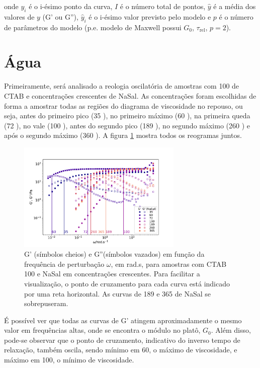 		\noindent onde \(y_i\) é o i-ésimo ponto da curva, \(I\) é o número total de pontos, \(\hat{y}\) é a média dos valores de \(y\) (G' ou G''), \(\hat{y}_i\) é o i-ésimo valor previsto pelo modelo e \(p\) é o número de parâmetros do modelo (p.e. modelo de Maxwell possui \(G_0\), \(\tau_\mathrm{rel}\), \(p=2\)).
		
		\section{Água}
		
		Primeiramente, será analisado a reologia oscilatória de amostras com 100 \mM{} de CTAB e concentrações crescentes de NaSal. As concentrações foram escolhidas de forma a amostrar todas as regiões do diagrama de viscosidade no repouso, ou seja, antes do primeiro pico (35 \mM), no primeiro máximo (60 \mM), na primeira queda (72 \mM), no vale (100 \mM), antes do segundo pico (189 \mM), no segundo máximo (260 \mM) e após o segundo máximo (360 \mM). A figura \ref{fig:oscilatorio_agua} mostra todos os reogramas juntos.
		
		\begin{figure}[h]
			\centering
			\includegraphics[width=0.7\textwidth]{imagens/reologia/oscilatorio_agua}
			\caption[Reogramas para água]{G' (símbolos cheios) e G''(símbolos vazados) em função da frequência de perturbação \(\omega\), em rad.s\menosUm, para amostras com CTAB 100\mM{} e NaSal em concentrações crescentes. Para facilitar a visualização, o ponto de cruzamento para cada curva está indicado por uma reta horizontal. As curvas de 189 e 365\mM{} de NaSal se sobrepuseram.}
			\label{fig:oscilatorio_agua}
		\end{figure}
		
		É possível ver que todas as curvas de G' atingem aproximadamente o mesmo valor em frequências altas, onde se encontra o módulo no platô, \(G_0\). Além disso, pode-se observar que o ponto de cruzamento, indicativo do inverso tempo de relaxação, também oscila, sendo mínimo em 60\mM, o máximo de viscosidade, e máximo em 100\mM, o mínimo de viscosidade.  %
		
